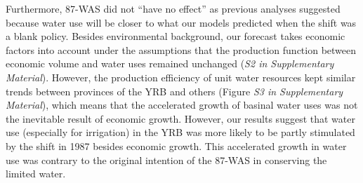 Furthermore, 87-WAS did not ``have no effect'' as previous analyses suggested because water use will be closer to what our models predicted when the shift was a blank policy.
Besides environmental background, our forecast takes economic factors into account under the assumptions that the production function between economic volume and water uses remained unchanged (\textit{S2 in Supplementary Material}).
However, the production efficiency of unit water resources kept similar trends between provinces of the YRB and others (Figure \textit{S3 in Supplementary Material}), which means that the accelerated growth of basinal water uses was not the inevitable result of economic growth.
However, our results suggest that water use (especially for irrigation) in the YRB was more likely to be partly stimulated by the shift in 1987 besides economic growth.
This accelerated growth in water use was contrary to the original intention of the 87-WAS in conserving the limited water.

